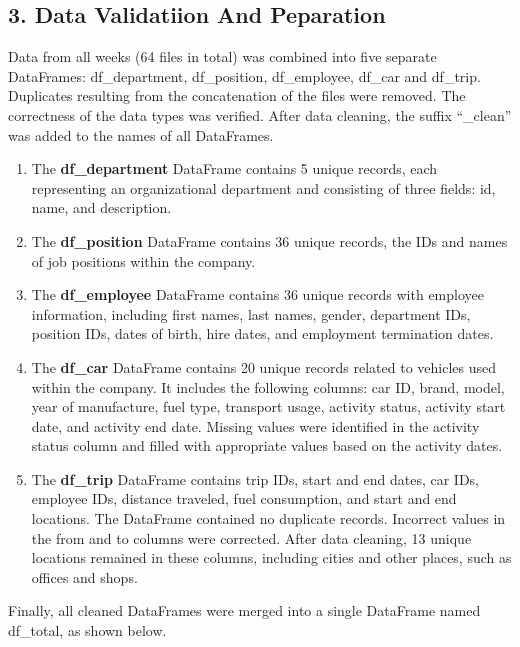 \documentclass[
  letterpaper,
  DIV=11,
  numbers=noendperiod]{scrartcl}
\providecommand{\tightlist}{%
  \setlength{\itemsep}{0pt}\setlength{\parskip}{0pt}}
\begin{document}
\subsection{3. Data Validatiion And
Peparation}\label{data-validatiion-and-peparation}

Data from all weeks (64 files in total) was combined into five separate
DataFrames: df\_department, df\_position, df\_employee, df\_car and
df\_trip. Duplicates resulting from the concatenation of the files were
removed. The correctness of the data types was verified. After data
cleaning, the suffix ``\_clean'' was added to the names of all
DataFrames.

\begin{enumerate}
\def\labelenumi{\arabic{enumi}.}
\tightlist
\item
  The \textbf{df\_department} DataFrame contains 5 unique records, each
  representing an organizational department and consisting of three
  fields: id, name, and description.
\item
  The \textbf{df\_position} DataFrame contains 36 unique records, the
  IDs and names of job positions within the company.
\item
  The \textbf{df\_employee} DataFrame contains 36 unique records with
  employee information, including first names, last names, gender,
  department IDs, position IDs, dates of birth, hire dates, and
  employment termination dates.
\item
  The \textbf{df\_car} DataFrame contains 20 unique records related to
  vehicles used within the company. It includes the following columns:
  car ID, brand, model, year of manufacture, fuel type, transport usage,
  activity status, activity start date, and activity end date. Missing
  values were identified in the activity status column and filled with
  appropriate values based on the activity dates.
\item
  The \textbf{df\_trip} DataFrame contains trip IDs, start and end
  dates, car IDs, employee IDs, distance traveled, fuel consumption, and
  start and end locations. The DataFrame contained no duplicate records.
  Incorrect values in the from and to columns were corrected. After data
  cleaning, 13 unique locations remained in these columns, including
  cities and other places, such as offices and shops.
\end{enumerate}

Finally, all cleaned DataFrames were merged into a single DataFrame
named df\_total, as shown below.
\end{document}
